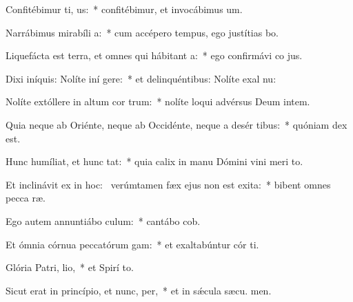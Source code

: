\item Confitébimur ti, us:~* confitébimur, et invocábimus  um.
\item Narrábimus mirabíli a:~* cum accépero tempus, ego justítias bo.
\item Liquefácta est terra, et omnes qui hábitant  a:~* ego confirmávi co jus.
\item Dixi iníquis: Nolíte iní gere:~* et delinquéntibus: Nolíte exal nu:
\item Nolíte extóllere in altum cor trum:~* nolíte loqui advérsus Deum intem.
\item Quia neque ab Oriénte, neque ab Occidénte, neque a desér tibus:~* quóniam  dex est.
\item Hunc humíliat, et hunc tat:~* quia calix in manu Dómini vini meri  to.
\item Et inclinávit ex  in hoc:~\pscross{} verúmtamen fæx ejus non est exita:~* bibent omnes pecca ræ.
\item Ego autem annuntiábo  culum:~* cantábo  cob.
\item Et ómnia córnua peccatórum gam:~* et exaltabúntur cór ti.
\item Glória Patri,  lio,~* et Spirí to.
\item Sicut erat in princípio, et nunc,  per,~* et in sǽcula sæcu. men.
